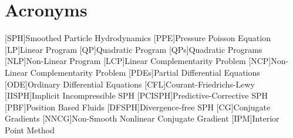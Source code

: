 \documentclass[conference]{IEEEtran}
\begin{document}
\section*{Acronyms}
\begin{acronym}[PCISPH] %
  [SPH]{Smoothed Particle Hydrodynamics}
    [PPE]{Pressure Poisson Equation}
    [LP]{Linear Program}
    [QP]{Quadratic Program}
    [QPs]{Quadratic Programs}
    [NLP]{Non-Linear Program}
    [LCP]{Linear Complementarity Problem}
    [NCP]{Non-Linear Complementarity Problem}
    [PDEs]{Partial Differential Equations}
    [ODE]{Ordinary Differential Equations}
    [CFL]{Courant-Friedrichs-Lewy}
    [IISPH]{Implicit Incompressible SPH}
    [PCISPH]{Predictive-Corrective SPH}
    [PBF]{Position Based Fluids}
    [DFSPH]{Divergence-free SPH}
    [CG]{Conjugate Gradients}
    [NNCG]{Non-Smooth Nonlinear Conjugate Gradient}
    [IPM]{Interior Point Method}
\end{acronym}
\end{document}
